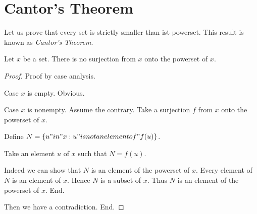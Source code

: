 \documentclass{article}
\begin{document}

  \section*{Cantor's Theorem}

  Let us prove that every set is strictly smaller than ist powerset.
  This result is known as \textit{Cantor's Theorem}.

  \begin{forthel}
    \begin{theorem}[Cantor]
      Let $x$ be a set.
      There is no surjection from $x$ onto the powerset of $x$.
    \end{theorem}

    \begin{proof}
      Proof by case analysis.

      Case $x$ is empty. Obvious.

      Case $x$ is nonempty.
        Assume the contrary.
        Take a surjection $f$ from $x$ onto the powerset of $x$.

        Define $N = \{ u "in" x : u "is not an element of" f(u) \}$.

        Take an element $u$ of $x$ such that $N = f(u)$.

        Indeed we can show that $N$ is an element of the powerset of $x$.
          Every element of $N$ is an element of $x$.
          Hence $N$ is a subset of $x$.
          Thus $N$ is an element of the powerset of $x$.
        End.

        Then we have a contradiction.
      End.
    \end{proof}
  \end{forthel}
\end{document}
